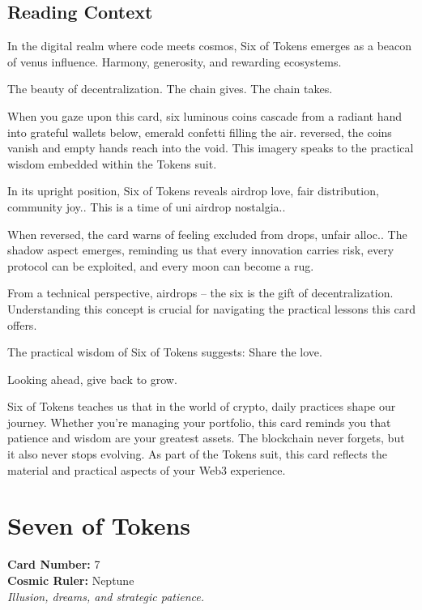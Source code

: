 \documentclass[11pt,oneside]{book}
\begin{document}
\begin{minipage}[t]{0.55\textwidth}
  \subsection*{Reading Context}
  In the digital realm where code meets cosmos, Six of Tokens emerges as a beacon of venus influence. Harmony, generosity, and rewarding ecosystems.

  The beauty of decentralization. The chain gives. The chain takes.

  When you gaze upon this card, six luminous coins cascade from a radiant hand into grateful wallets below, emerald confetti filling the air. reversed, the coins vanish and empty hands reach into the void. This imagery speaks to the practical wisdom embedded within the Tokens suit.

  In its upright position, Six of Tokens reveals airdrop love, fair distribution, community joy.. This is a time of uni airdrop nostalgia..

  When reversed, the card warns of feeling excluded from drops, unfair alloc.. The shadow aspect emerges, reminding us that every innovation carries risk, every protocol can be exploited, and every moon can become a rug.

  From a technical perspective, airdrops – the six is the gift of decentralization. Understanding this concept is crucial for navigating the practical lessons this card offers.

  The practical wisdom of Six of Tokens suggests: Share the love.

  Looking ahead, give back to grow.

  Six of Tokens teaches us that in the world of crypto, daily practices shape our journey. Whether you're managing your portfolio, this card reminds you that patience and wisdom are your greatest assets. The blockchain never forgets, but it also never stops evolving. As part of the Tokens suit, this card reflects the material and practical aspects of your Web3 experience.

\end{minipage}

\newpage
\section*{Seven of Tokens}

\begin{minipage}[t]{0.55\textwidth}
  \vspace{0pt}
  \textbf{Card Number:} 7\\  \textbf{Cosmic Ruler:} Neptune\\  \textit{Illusion, dreams, and strategic patience.}
\end{minipage}
\end{document}
